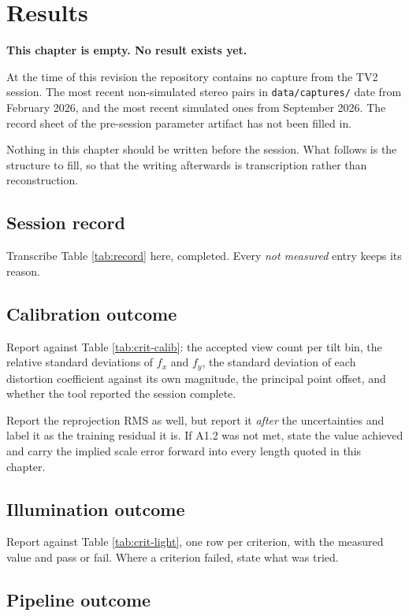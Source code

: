 \chapter{Results}
\label{chap:results}

\textbf{This chapter is empty. No result exists yet.}

At the time of this revision the repository contains no capture from the TV2
session. The most recent non-simulated stereo pairs in
\texttt{data/captures/} date from February 2026, and the most recent
simulated ones from September 2026. The record sheet of the pre-session
parameter artifact has not been filled in.

Nothing in this chapter should be written before the session. What follows is
the structure to fill, so that the writing afterwards is transcription rather
than reconstruction.

\section{Session record}

Transcribe Table \ref{tab:record} here, completed. Every \emph{not measured}
entry keeps its reason.

\section{Calibration outcome}

Report against Table \ref{tab:crit-calib}: the accepted view count per tilt
bin, the relative standard deviations of $f_x$ and $f_y$, the standard
deviation of each distortion coefficient against its own magnitude, the
principal point offset, and whether the tool reported the session complete.

Report the reprojection RMS as well, but report it \emph{after} the
uncertainties and label it as the training residual it is. If A1.2 was not
met, state the value achieved and carry the implied scale error forward into
every length quoted in this chapter.

\section{Illumination outcome}

Report against Table \ref{tab:crit-light}, one row per criterion, with the
measured value and pass or fail. Where a criterion failed, state what was
tried.

\section{Pipeline outcome}

